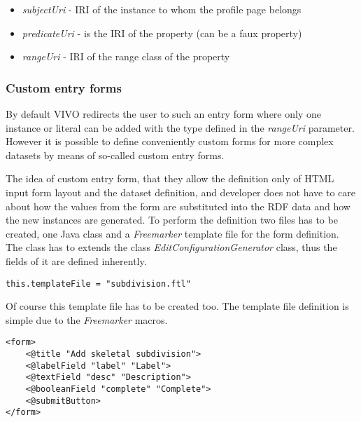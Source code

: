 \begin{itemize}
	\item{ \textit{subjectUri}} - IRI of the instance to whom the profile page belongs
	\item{ \textit{predicateUri}} -  is the IRI of the property (can be a faux property)
	\item{ \textit{rangeUri}} - IRI of the range class of the property
\end{itemize}

\subsubsection{Custom entry forms} \label{vivoCef}



By default VIVO redirects the user to such an entry form where only one instance or literal can be added with the type defined in the \textit{rangeUri} parameter. However it is possible to define conveniently custom forms for more complex datasets by means of so-called custom entry forms.



 The idea of custom entry form, that they allow the definition only of HTML input form layout and the dataset definition, and developer does not have to care about how the values from the form are substituted into the RDF data and how the new instances are generated. To perform the definition two files has to be created, one Java class and a \textit{Freemarker} template file for the form definition. The class has to extends the class \textit{EditConfigurationGenerator} class, thus the fields of it are defined inherently.


\begin{lstlisting}[captionpos=b, caption= Form defintion in Java, label=skullJSON, belowskip=1em, aboveskip=2em,
basicstyle=\footnotesize,frame=single]
	this.templateFile = "subdivision.ftl"
\end{lstlisting}


Of course this template file has to be created too. The template file definition is simple due to the \textit{Freemarker} macros.

\begin{lstlisting}[captionpos=b, caption= subdivision.ftl, label=skullJSON, belowskip=1em, aboveskip=2em,
basicstyle=\footnotesize,frame=single]
<form>
	<@title "Add skeletal subdivision">
	<@labelField "label" "Label">
	<@textField	"desc" "Description">
	<@booleanField "complete" "Complete">
	<@submitButton>
</form>	
\end{lstlisting}

